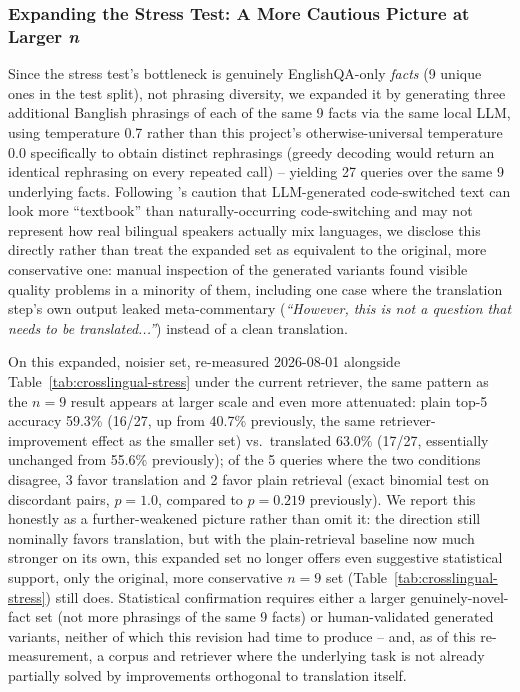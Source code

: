 \documentclass[a4paper,twoside]{article}
\begin{document}
\subsubsection{Expanding the Stress Test: A More Cautious Picture at Larger \emph{n}}

Since the stress test's bottleneck is genuinely EnglishQA-only \emph{facts} (9 unique ones in the test split), not phrasing diversity, we expanded it by generating three additional Banglish phrasings of each of the same 9 facts via the same local LLM, using temperature 0.7 rather than this project's otherwise-universal temperature 0.0 specifically to obtain distinct rephrasings (greedy decoding would return an identical rephrasing on every repeated call) -- yielding 27 queries over the same 9 underlying facts. Following \citet{dogruoz2023representativeness}'s caution that LLM-generated code-switched text can look more ``textbook'' than naturally-occurring code-switching and may not represent how real bilingual speakers actually mix languages, we disclose this directly rather than treat the expanded set as equivalent to the original, more conservative one: manual inspection of the generated variants found visible quality problems in a minority of them, including one case where the translation step's own output leaked meta-commentary (\emph{``However, this is not a question that needs to be translated...''}) instead of a clean translation.

On this expanded, noisier set, re-measured 2026-08-01 alongside Table~\ref{tab:crosslingual-stress} under the current retriever, the same pattern as the $n=9$ result appears at larger scale and even more attenuated: plain top-5 accuracy 59.3\% (16/27, up from 40.7\% previously, the same retriever-improvement effect as the smaller set) vs.\ translated 63.0\% (17/27, essentially unchanged from 55.6\% previously); of the 5 queries where the two conditions disagree, 3 favor translation and 2 favor plain retrieval (exact binomial test on discordant pairs, $p=1.0$, compared to $p=0.219$ previously). We report this honestly as a further-weakened picture rather than omit it: the direction still nominally favors translation, but with the plain-retrieval baseline now much stronger on its own, this expanded set no longer offers even suggestive statistical support, only the original, more conservative $n=9$ set (Table~\ref{tab:crosslingual-stress}) still does. Statistical confirmation requires either a larger genuinely-novel-fact set (not more phrasings of the same 9 facts) or human-validated generated variants, neither of which this revision had time to produce -- and, as of this re-measurement, a corpus and retriever where the underlying task is not already partially solved by improvements orthogonal to translation itself.
\end{document}

